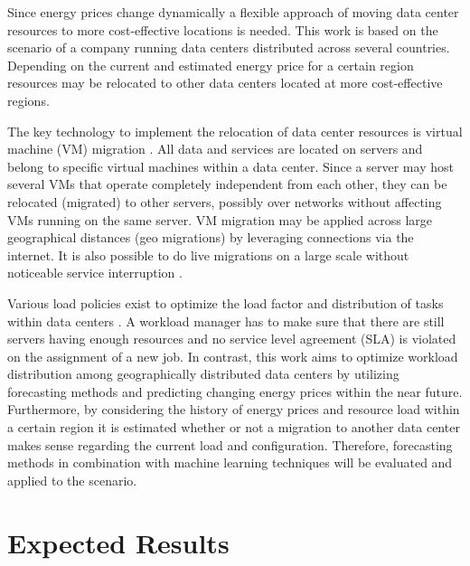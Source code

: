 \documentclass[a4paper]{article}
\begin{document}
Since energy prices change dynamically a flexible approach of moving data center resources to more cost-effective locations is needed. This work is based on the scenario of a company running data centers distributed across several countries. Depending on the current and estimated energy price for a certain region resources may be relocated to other data centers located at more cost-effective regions.

The key technology to implement the relocation of data center resources is virtual machine (VM) migration \cite{nelson2009virtual}. All data and services are located on servers and belong to specific virtual machines within a data center. Since a server may host several VMs that operate completely independent from each other, they can be relocated (migrated) to other servers, possibly over networks without affecting VMs running on the same server. VM migration may be applied across large geographical distances (geo migrations) by leveraging connections via the internet. It is also possible to do live migrations on a large scale without noticeable service interruption \cite{celesti2010improving}. 

Various load policies exist to optimize the load factor and distribution of tasks within data centers \cite{buyya2010energy}. A workload manager has to make sure that there are still servers having enough resources and no service level agreement (SLA) is violated on the assignment of a new job. 
In contrast, this work aims to optimize workload distribution among geographically distributed data centers by utilizing forecasting methods and predicting changing energy prices within the near future. 
Furthermore, by considering the history of energy prices and resource load within a certain region it is estimated whether or not a migration to another data center makes sense regarding the current load and configuration. Therefore, forecasting methods in combination with machine learning techniques will be evaluated and applied to the scenario. 


\section{Expected Results}
\end{document}
